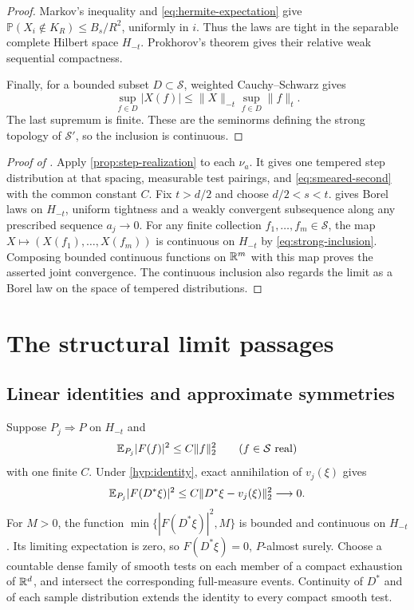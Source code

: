 \begin{proof}
Markov's inequality and \eqref{eq:hermite-expectation} give
$\mathbb P(X_i\notin K_R)\le B_s/R^2$, uniformly in $i$.
Thus the laws are tight in the separable complete Hilbert space
$H_{-t}$. Prokhorov's theorem
\cite[Theorem~1.1]{Sorensen} gives their relative weak sequential
compactness.

Finally, for a bounded subset $D\subset\mathcal S$, weighted
Cauchy--Schwarz gives
\begin{equation}\label{eq:strong-inclusion}
 \sup_{f\in D}|X(f)|\le\|X\|_{-t}\sup_{f\in D}\|f\|_t.
\end{equation}
The last supremum is finite. These are the seminorms defining
the strong topology of $\mathcal S'$, so the inclusion is
continuous.
\end{proof}

\begin{proof}[Proof of ]
Apply \cref{prop:step-realization} to each $\nu_a$. It gives
one tempered step distribution at that spacing, measurable test
pairings, and \eqref{eq:smeared-second} with the common constant
$C$. Fix $t>d/2$ and choose $d/2<s<t$.
 gives Borel laws on $H_{-t}$,
uniform tightness and a weakly convergent subsequence along
any prescribed sequence $a_j\to0$. For any finite collection
$f_1,\ldots,f_m\in\mathcal S$, the map
$X\mapsto(X(f_1),\ldots,X(f_m))$ is continuous on $H_{-t}$
by \eqref{eq:strong-inclusion}. Composing bounded continuous
functions on $\mathbb R^m$ with this map proves the asserted joint
convergence. The continuous inclusion also regards the limit
as a Borel law on the space of tempered distributions.
\end{proof}

\section{The structural limit passages}\label{sec:stability}

\subsection{Linear identities and approximate symmetries}
Suppose \(P_j\Rightarrow P\) on \(H_{-t}\) and
\begin{equation}\label{eq:quadratic}
 \mathbb E_{P_j}|F(f)|^2\le C\|f\|_2^2
 \qquad(f\in\mathcal S\text{ real})
\end{equation}
with one finite \(C\).
Under \cref{hyp:identity}, exact annihilation of \(v_j(\xi)\) gives
\begin{equation}\label{eq:identity-residual}
 \mathbb E_{P_j}|F(D^*\xi)|^2
 \le C\|D^*\xi-v_j(\xi)\|_2^2\longrightarrow0.
\end{equation}
For \(M>0\), the function
\(\min\{|F(D^*\xi)|^2,M\}\) is bounded and continuous on \(H_{-t}\).
Its limiting expectation is zero, so \(F(D^*\xi)=0\),
\(P\)-almost surely. Choose a countable dense family of smooth tests
on each member of a compact exhaustion of \(\mathbb R^d\), and intersect
the corresponding full-measure events. Continuity of \(D^*\) and
of each sample distribution extends the identity to every compact
smooth test.

